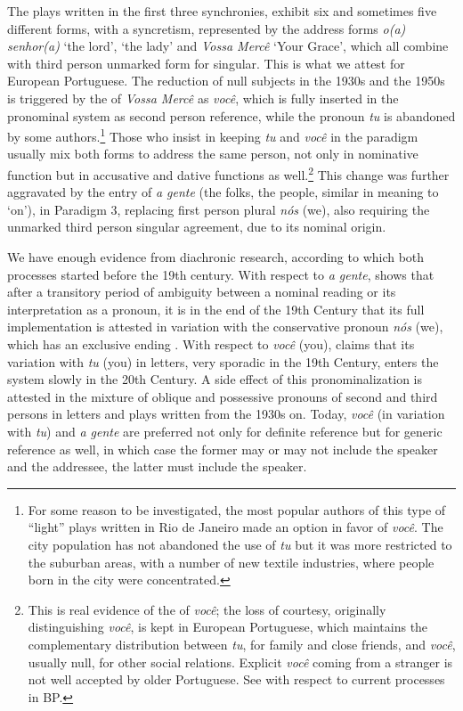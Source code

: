 \documentclass[output=paper]{langsci/langscibook}
\begin{document}
The plays written in the first three synchronies, exhibit six  and sometimes
five different forms, with a syncretism, represented by the address forms
\emph{o(a) senhor(a)} \enquote*{the lord}, \enquote*{the lady} and \emph{Vossa
Mercê} \enquote*{Your Grace}, which all combine with third person unmarked form
for singular.  This is what we attest for European Portuguese. The reduction of
null subjects in the 1930s and the 1950s is triggered by the
of \emph{Vossa Mercê} as \emph{você}, which is fully inserted in the pronominal
system as second person reference, while the pronoun \emph{tu} is abandoned by
some authors.\footnote{For some reason to be investigated, the most popular
    authors of this type of “light” plays written in Rio de Janeiro made an option
in favor of \emph{você}. The city population has not abandoned the use of
\emph{tu} but it was more restricted to the suburban areas, with a number of
new textile industries, where people born in the city were concentrated.} Those
who insist in keeping \emph{tu} and \emph{você} in the paradigm usually mix
both forms to address the same person, not only in nominative function but in
accusative and dative functions as well.\footnote{This is real evidence of the
     of \emph{você}; the loss of courtesy, originally
    distinguishing \emph{você}, is kept in European Portuguese, which maintains
    the complementary distribution between \emph{tu}, for family and close
    friends, and \emph{você}, usually null, for other social relations.
    Explicit \emph{você} coming from a stranger is not well accepted by older
Portuguese. See \citet{LopesBrocardo2016} with respect to current
 processes in \gls{BP}.} This change
was further aggravated by the entry of \emph{a gente} (the folks, the people,
similar in meaning to  \enquote*{on}), in Paradigm 3, replacing
first person plural \emph{nós} (we), also requiring the unmarked third person
singular agreement, due to its nominal origin.

We have enough evidence from diachronic research, according to which both
processes started before the 19th century. With respect to \emph{a gente},
\citet{Lopes2003} shows that after a transitory period of ambiguity between a
nominal reading or its interpretation as a pronoun, it is in the end of the
19th Century that its full implementation is attested in variation with the
conservative pronoun \emph{nós} (we), which has an exclusive ending
.  With respect to \emph{você} (you), \citet{Lopes2003}
claims that its variation with \emph{tu} (you) in letters, very sporadic in the
19th Century, enters the system slowly in the 20th Century. A side  effect of
this pronominalization is attested in the mixture of oblique and possessive
pronouns of second and third persons in letters and plays written from the
1930s on. Today, \emph{você} (in variation with \emph{tu}) and \emph{a gente}
are preferred not only for definite reference but for generic reference as
well, in which case the former may or may not include the speaker and the
addressee, the latter must include the speaker.
\end{document}
